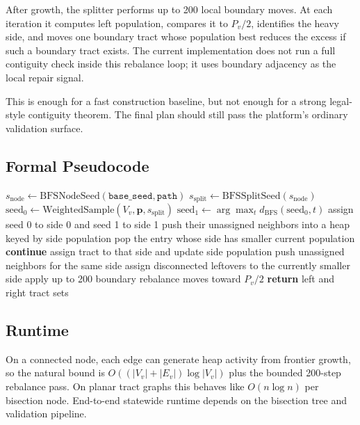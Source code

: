 After growth, the splitter performs up to 200 local boundary moves. At each
iteration it computes left population, compares it to $P_v/2$, identifies the
heavy side, and moves one boundary tract whose population best reduces the
excess if such a boundary tract exists. The current implementation does not run
a full contiguity check inside this rebalance loop; it uses boundary adjacency
as the local repair signal.

This is enough for a fast construction baseline, but not enough for a strong
legal-style contiguity theorem. The final plan should still pass the platform's
ordinary validation surface.

\subsection{Formal Pseudocode}

\begin{algorithm}[t]
\caption{\bfsg{}-\textsc{Bisect}($G_v$, $\mathbf{p}$, $\mathtt{base\_seed}$, $\mathtt{path}$)}
\label{alg:bfs}
\begin{algorithmic}[1]
\State $s_{\mathrm{node}} \gets \mathrm{BFSNodeSeed}(\mathtt{base\_seed}, \mathtt{path})$
\State $s_{\mathrm{split}} \gets \mathrm{BFSSplitSeed}(s_{\mathrm{node}})$
\State $\mathrm{seed}_0 \gets \mathrm{WeightedSample}(V_v, \mathbf{p}, s_{\mathrm{split}})$
\State $\mathrm{seed}_1 \gets \arg\max_t d_{\mathrm{BFS}}(\mathrm{seed}_0,t)$
\State assign seed 0 to side 0 and seed 1 to side 1
\State push their unassigned neighbors into a heap keyed by side population
  \State pop the entry whose side has smaller current population
   \textbf{continue} \EndIf
  \State assign tract to that side and update side population
  \State push unassigned neighbors for the same side
\EndWhile
\State assign disconnected leftovers to the currently smaller side
\State apply up to 200 boundary rebalance moves toward $P_v/2$
\State \textbf{return} left and right tract sets
\end{algorithmic}
\end{algorithm}

\subsection{Runtime}

On a connected node, each edge can generate heap activity from frontier growth,
so the natural bound is $O((|V_v|+|E_v|)\log |V_v|)$ plus the bounded 200-step
rebalance pass. On planar tract graphs this behaves like $O(n\log n)$ per
bisection node. End-to-end statewide runtime depends on the bisection tree and
validation pipeline.

